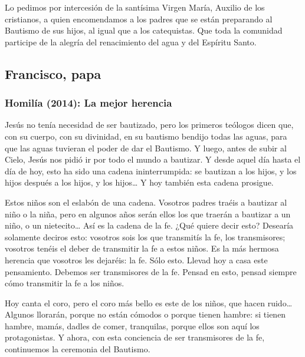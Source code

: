 \begin{body}
					Lo pedimos por intercesión de la santísima Virgen María, Auxilio de los cristianos, a quien encomendamos a los padres que se están preparando al Bautismo de sus hijos, al igual que a los catequistas. Que toda la comunidad participe de la alegría del renacimiento del agua y del Espíritu Santo.
				\end{body}
	
\newsection

	\subsection{Francisco, papa}
	
		\subsubsection{Homilía (2014): La mejor herencia}
		
			
			\begin{body}
				Jesús no tenía necesidad de ser bautizado, pero los primeros teólogos dicen que, con su cuerpo, con su divinidad, en su bautismo bendijo todas las aguas, para que las aguas tuvieran el poder de dar el Bautismo. Y luego, antes de subir al Cielo, Jesús nos pidió ir por todo el mundo a bautizar. Y desde aquel día hasta el día de hoy, esto ha sido una cadena ininterrumpida: se bautizan a los hijos, y los hijos después a los hijos, y los hijos\ldots{} Y hoy también esta cadena prosigue.
				
				Estos niños son el eslabón de una cadena. Vosotros padres traéis a bautizar al niño o la niña, pero en algunos años serán ellos los que traerán a bautizar a un niño, o un nietecito\ldots{} Así es la cadena de la fe. ¿Qué quiere decir esto? Desearía solamente deciros esto: vosotros sois los que transmitís la fe, los transmisores; vosotros tenéis el deber de transmitir la fe a estos niños. Es la más hermosa herencia que vosotros les dejaréis: la fe. Sólo esto. Llevad hoy a casa este pensamiento. Debemos ser transmisores de la fe. Pensad en esto, pensad siempre cómo transmitir la fe a los niños.
				
				Hoy canta el coro, pero el coro más bello es este de los niños, que hacen ruido\ldots{} Algunos llorarán, porque no están cómodos o porque tienen hambre: si tienen hambre, mamás, dadles de comer, tranquilas, porque ellos son aquí los protagonistas. Y ahora, con esta conciencia de ser transmisores de la fe, continuemos la ceremonia del Bautismo.
			\end{body}
		
